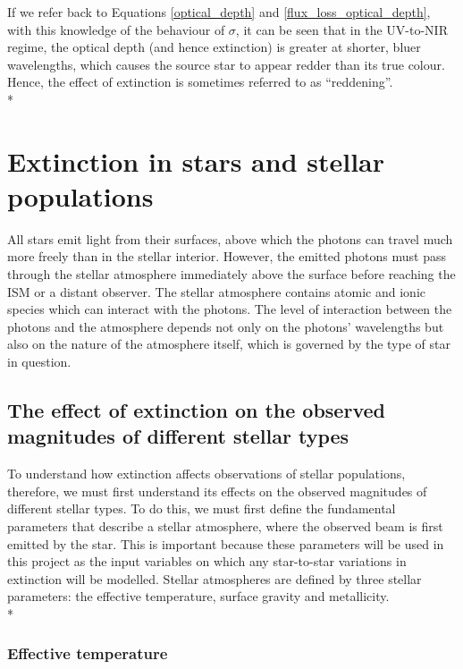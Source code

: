 \documentclass[12pt, a4paper]{report}
\begin{document}
If we refer back to Equations \ref{optical_depth} and \ref{flux_loss_optical_depth}, with this knowledge of the behaviour of $\sigma$, it can be seen that in the UV-to-NIR regime, the optical depth (and hence extinction) is greater at shorter, bluer wavelengths,  which causes the source star to appear redder than its true colour. Hence, the effect of extinction is sometimes referred to as ``reddening''. \\*

\section{Extinction in stars and stellar populations}
All stars emit light from their surfaces, above which the photons can travel much more freely than in the stellar interior. However, the emitted photons must pass through the stellar atmosphere immediately above the surface before reaching the ISM or a distant observer. The stellar atmosphere contains atomic and ionic species which can interact with the photons. The level of interaction between the photons and the atmosphere depends not only on the photons' wavelengths but also on the nature of the atmosphere itself, which is governed by the type of star in question.

\subsection{The effect of extinction on the observed magnitudes of different stellar types} \label{params}

To understand how extinction affects observations of stellar populations, therefore, we must first understand its effects on the observed magnitudes of different stellar types. To do this, we must first define the fundamental parameters that describe a stellar atmosphere, where the observed beam is first emitted by the star. This is important because these parameters will be used in this project as the input variables on which any star-to-star variations in extinction will be modelled. Stellar atmospheres are defined by three stellar parameters: the effective temperature, surface gravity and metallicity.\\*

\subsubsection{Effective temperature}
\end{document}
